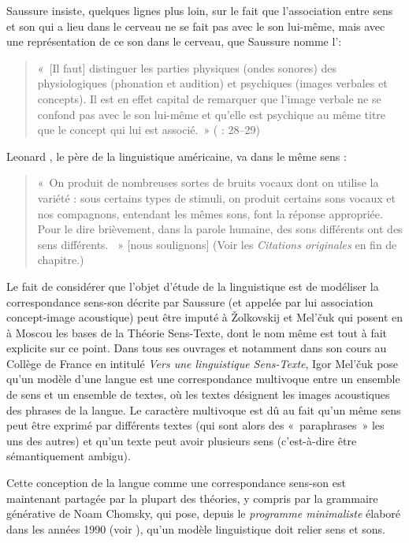 {    Saussure insiste, quelques lignes plus loin, sur le fait que l’association entre sens et son qui a lieu dans le cerveau ne se fait pas avec le son lui-même, mais avec une représentation de ce son dans le cerveau, que Saussure nomme l’:

    \begin{quote}
    «~[Il faut] distinguer les parties physiques (ondes sonores) des physiologiques (phonation et audition) et psychiques (images verbales et concepts). Il est en effet capital de remarquer que l’image verbale ne se confond pas avec le son lui-même et qu’elle est psychique au même titre que le concept qui lui est associé.~» (\citealt{saussure1916cours} : 28--29)
    \end{quote}

    Leonard \citet[27]{bloomfield1933language}, le père de la linguistique américaine, va dans le même sens :

    \begin{quote}
    «~On produit de nombreuses sortes de bruits vocaux dont on utilise la variété : sous certains types de stimuli, on produit certains sons vocaux et nos compagnons, entendant les mêmes sons, font la réponse appropriée. Pour le dire brièvement, dans la parole humaine, des sons différents ont des sens différents.    ~» [nous soulignons] (Voir les \textit{Citations originales} en fin de chapitre.)
    \end{quote}

    Le fait de considérer que l’objet d’étude de la linguistique est de modéliser la correspondance sens-son décrite par Saussure (et appelée par lui association concept-image acoustique) peut être imputé à Žolkovskij et Mel’čuk qui posent en \citeyear{zolkovski1967semanticeskom} à Moscou les bases de la Théorie Sens-Texte, dont le nom même est tout à fait explicite sur ce point. Dans tous ses ouvrages et notamment dans son cours au Collège de France en \citeyear{melcuk1997vers} intitulé \textit{Vers une linguistique Sens-Texte}, Igor Mel’čuk pose qu’un modèle d’une langue est une correspondance multivoque entre un ensemble de sens et un ensemble de textes, où les textes désignent les images acoustiques des phrases de la langue. Le caractère multivoque est dû au fait qu’un même sens peut être exprimé par différents textes (qui sont alors des «~paraphrases~» les uns des autres) et qu’un texte peut avoir plusieurs sens (c’est-à-dire être sémantiquement ambigu).

    Cette conception de la langue comme une correspondance sens-son est maintenant partagée par la plupart des théories, y compris par la grammaire générative de Noam Chomsky, qui pose, depuis le \textit{programme minimaliste} élaboré dans les années 1990 (voir \citealt{chomsky1995minimalist}), qu’un modèle linguistique doit relier sens et sons.
}
